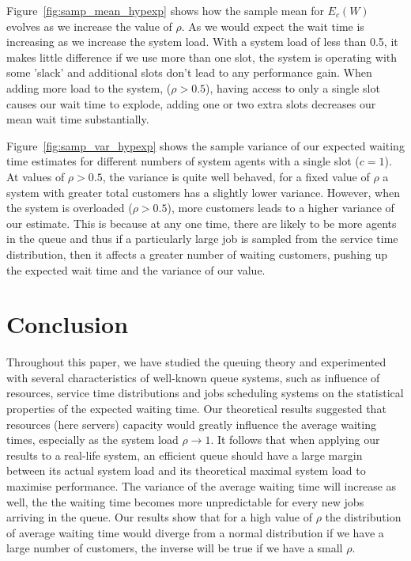 \documentclass{article}
\begin{document}
    Figure~\ref{fig:samp_mean_hypexp} shows how the sample mean for $E_c(W)$ evolves as we increase the value of $\rho$. As we would expect the wait time is increasing as we increase the system load. With a system load of less than 0.5, it makes little difference if we use more than one slot, the system is operating with some 'slack' and additional slots don't lead to any performance gain. When adding more load to the system, ($\rho > 0.5$), having access to only a single slot causes our wait time to explode, adding one or two extra slots decreases our mean wait time substantially.

    Figure~\ref{fig:samp_var_hypexp} shows the sample variance of our expected waiting time estimates for different numbers of system agents with a single slot ($c = 1$). At values of $\rho > 0.5$, the variance is quite well behaved, for a fixed value of $\rho$ a system with greater total customers has a slightly lower variance. However, when the system is overloaded ($\rho > 0.5$), more customers leads to a higher variance of our estimate. This is because at any one time, there are likely to be more agents in the queue and thus if a particularly large job is sampled from the service time distribution, then it affects a greater number of waiting customers, pushing up the expected wait time and the variance of our value.

    \section*{Conclusion}
    Throughout this paper, we have studied the queuing theory and experimented with several characteristics of well-known queue systems, such as influence of resources, service time distributions and jobs scheduling systems on the statistical properties of the expected waiting time. Our theoretical results suggested that resources (here servers) capacity would greatly influence the average waiting times, especially as the system load $\rho \rightarrow{1}$. It follows that when applying our results to a real-life system, an efficient queue should have a large margin between its actual system load and its theoretical maximal system load to maximise performance. The variance of the average waiting time will increase as well, the the waiting time becomes more unpredictable for every new jobs arriving in the queue. Our results show that for a high value of $\rho$ the distribution of average waiting time would diverge from a normal distribution if we have a large number of customers, the inverse will be true if we have a small $\rho$.
\end{document}
